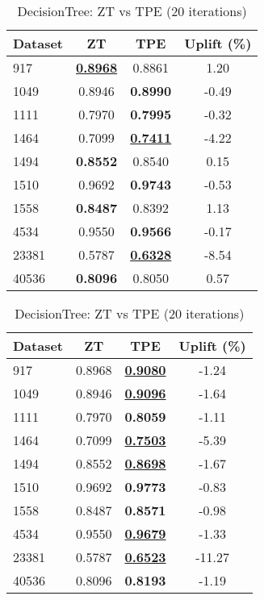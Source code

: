 \begin{table}[htbp]
\begin{center}
\begin{small}
\begin{sc}
\begin{subtable}[t]{0.48\textwidth}
    \centering
    \caption{DecisionTree: ZT vs TPE (10 iterations)}
    \label{tab:decisiontree-zt-vs-tpe-10}
    \begin{tabular}{lccc}
    \toprule
    \textbf{Dataset} & \textbf{ZT} & \textbf{TPE} & \textbf{Uplift (\%)} \\
    \midrule
    917    & \underline{\textbf{0.8968}} & 0.8861 & 1.20 \\
    1049    & 0.8946 & \textbf{0.8990} & -0.49 \\
    1111    & 0.7970 & \textbf{0.7995} & -0.32 \\
    1464    & 0.7099 & \underline{\textbf{0.7411}} & -4.22 \\
    1494    & \textbf{0.8552} & 0.8540 & 0.15 \\
    1510    & 0.9692 & \textbf{0.9743} & -0.53 \\
    1558    & \textbf{0.8487} & 0.8392 & 1.13 \\
    4534    & 0.9550 & \textbf{0.9566} & -0.17 \\
    23381    & 0.5787 & \underline{\textbf{0.6328}} & -8.54 \\
    40536    & \textbf{0.8096} & 0.8050 & 0.57 \\
    \bottomrule
    \end{tabular}
\end{subtable}
\hfill
\begin{subtable}[t]{0.48\textwidth}
    \centering
    \caption{DecisionTree: ZT vs TPE (20 iterations)}
    \label{tab:decisiontree-zt-vs-tpe-20}
    \begin{tabular}{lccc}
    \toprule
    \textbf{Dataset} & \textbf{ZT} & \textbf{TPE} & \textbf{Uplift (\%)} \\
    \midrule
    917    & 0.8968 & \underline{\textbf{0.9080}} & -1.24 \\
    1049    & 0.8946 & \underline{\textbf{0.9096}} & -1.64 \\
    1111    & 0.7970 & \textbf{0.8059} & -1.11 \\
    1464    & 0.7099 & \underline{\textbf{0.7503}} & -5.39 \\
    1494    & 0.8552 & \underline{\textbf{0.8698}} & -1.67 \\
    1510    & 0.9692 & \textbf{0.9773} & -0.83 \\
    1558    & 0.8487 & \textbf{0.8571} & -0.98 \\
    4534    & 0.9550 & \underline{\textbf{0.9679}} & -1.33 \\
    23381    & 0.5787 & \underline{\textbf{0.6523}} & -11.27 \\
    40536    & 0.8096 & \textbf{0.8193} & -1.19 \\
    \bottomrule
    \end{tabular}
\end{subtable}

\end{sc}
\end{small}
\end{center}
\vskip -0.1in
\end{table}